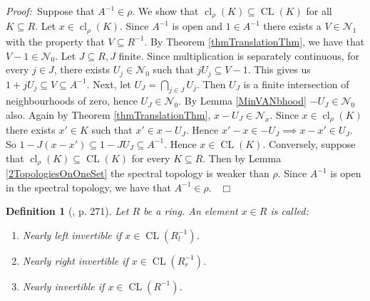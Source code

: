 \documentclass[12pt, oneside]{book}
\newtheorem{definition}[theorem]{Definition}
\newcommand{\proof}{{\noindent \it Proof:~}}
\newcommand{\qed}{\hfill ~$\Box$\\}
\def\cl{\operatorname{cl}}
\def\CL{\operatorname{CL}}
\begin{document}
\proof  \space Suppose that $A^{-1} \in \rho.$ We show that 
$\cl_{\rho}(K) \subseteq \CL(K)$ for all 
$K \subseteq R.$ Let $x \in \cl_{\rho}(K)$. Since $A^{-1}$ is open and $1 \in A^{-1}$ there exists a 
$V \in \mathcal{N}_1$ with the property that $V \subseteq R^{-1}$. By Theorem \ref{thmTranslationThm}, 
we have that $V - 1 \in \mathcal{N}_0$. Let $J \subseteq R, J$ finite. 
Since multiplication is separately continuous, for every $j \in J$, 
there exists $U_j \in \mathcal{N}_0$ such that $j U_j \subseteq V - 1$. 
This gives us $1 + jU_j \subseteq V \subseteq A^{-1}$. Next, let $U_J = \bigcap\limits_{j \in J} U_j$. 
Then $U_J$ is a finite intersection of neighbourhoods of zero, hence $U_J \in \mathcal{N}_0$. By Lemma
\ref{MinVANbhood} $-U_J \in \mathcal{N}_0$ also. Again by Theorem \ref{thmTranslationThm}, 
$x - U_J \in \mathcal{N}_x$. 
Since $x \in \cl_{\rho}(K)$ there exists $x' \in K$ such that $x' \in x - U_J$. 
Hence $x' - x \in -U_J \implies x - x' \in U_J$. So $1 - J(x - x') \subseteq 1 - JU_J \subseteq A^{-1}$. 
Hence $x \in \CL(K)$.
\vskip 0.3cm
\noindent Conversely, suppose that $\cl_{\rho}(K) \subseteq \CL(K)$ for every $K \subseteq R$. 
Then by Lemma \ref{2TopologiesOnOneSet} the spectral topology is weaker than $\rho$. Since $A^{-1}$ is open in the spectral topology, we have that $A^{-1} \in \rho$.
\qed

\begin{definition}[\cite{CH3}, p. 271]
\normalfont
\noindent
Let $R$ be a ring. An element $x \in R$ is called:

\begin{enumerate}[label=(\alph*)]

\item {\sl Nearly left invertible} if $x \in \CL(R_l^{-1})$.

\item {\sl Nearly right invertible} if $x \in \CL(R_r^{-1})$.

\item {\sl Nearly invertible} if $x \in \CL(R^{-1})$.

\end{enumerate}

\end{definition}
\end{document}
